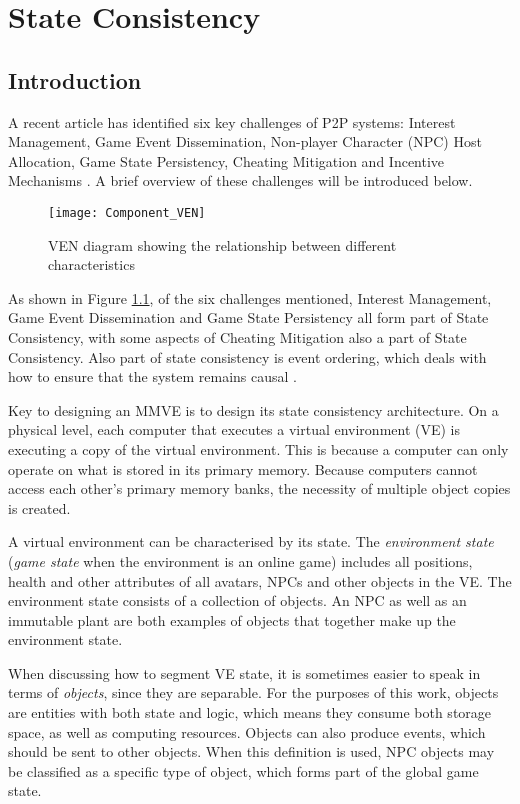 \chapter{State Consistency}
\label{chp:CONSISTENCY}

\section{Introduction}

A recent article has identified six key challenges of P2P systems: Interest Management, Game Event Dissemination, Non-player Character (NPC) Host
Allocation, Game State Persistency, Cheating Mitigation and Incentive Mechanisms \cite{Fan_deisgn_issues_p2p}. A brief overview of these challenges
will be introduced below.

\begin{figure}[htbp]
 \centering
 \texttt{[image: Component\_VEN]}
 \caption{VEN diagram showing the relationship between different characteristics}
 \label{fig_component_ven}
\end{figure}
%
As shown in Figure \ref{fig_component_ven}, of the six challenges mentioned, Interest Management, Game Event Dissemination and Game State Persistency
all form part of State Consistency, with some aspects of Cheating Mitigation also a part of State Consistency. Also part of state consistency is
event ordering, which deals with how to ensure that the system remains causal \cite{GauthierDickey_low_latency_event_ordering}.

Key to designing an MMVE is to design its state consistency architecture. On a physical level, each computer that executes a virtual environment (VE) is executing a copy of the virtual environment. This is because a computer can only operate on what is stored in its primary memory. Because computers cannot access each other's primary memory banks, the necessity of multiple object copies is created.

A virtual environment can be characterised by its state. The \emph{environment state} (\emph{game state} when the environment is an online game) includes all positions, health and other attributes of all avatars, NPCs and other objects in the VE. The environment state consists of a collection of objects. An NPC as well as an immutable plant are both examples of objects that together make up the environment state.

When discussing how to segment VE state, it is sometimes easier to speak in terms of \emph{objects}, since they are separable. For the purposes of this work, objects are entities with both state and logic, which means they consume both storage space, as well as computing resources. Objects can also produce events, which should be sent to other objects. When this definition is used, NPC objects may be classified as a specific type of object, which forms part of the global game state.

